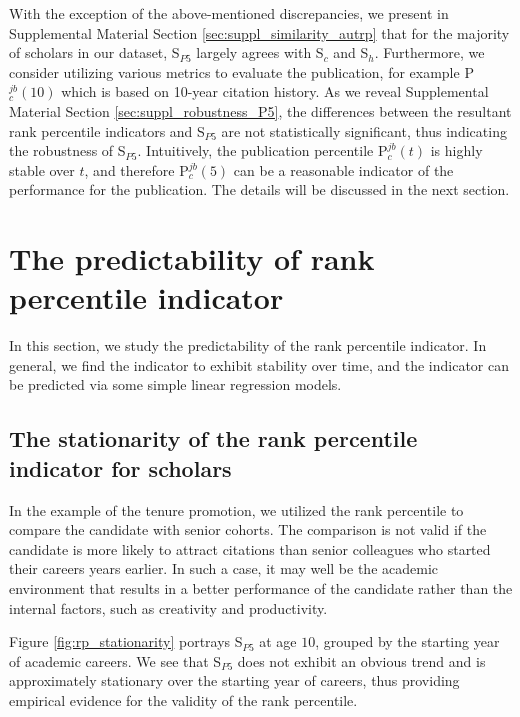 With the exception of the above-mentioned discrepancies, we present in Supplemental Material Section \ref{sec:suppl_similarity_autrp} that for the majority of scholars in our dataset, S$_{P5}$ largely agrees with S$_c$ and S$_h$. Furthermore, we consider utilizing various metrics to evaluate the publication, for example P$_c^{jb}(10)$ which is based on 10-year citation history. As we reveal Supplemental Material Section \ref{sec:suppl_robustness_P5}, the differences between the resultant rank percentile indicators and S$_{P5}$ are not statistically significant, thus indicating the robustness of S$_{P5}$. Intuitively, the publication percentile P$_c^{jb}(t)$ is highly stable over $t$, and therefore P$_c^{jb}(5)$ can be a reasonable indicator of the performance for the publication. The details will be discussed in the next section.

\section*{The predictability of rank percentile indicator}

In this section, we study the predictability of the rank percentile indicator. In general, we find the indicator to exhibit stability over time, and the indicator can be predicted via some simple linear regression models. 

\subsection*{The stationarity of the rank percentile indicator for scholars}

In the example of the tenure promotion, we utilized the rank percentile to compare the candidate with senior cohorts. The comparison is not valid if the candidate is more likely to attract citations than senior colleagues who started their careers years earlier. In such a case, it may well be the academic environment that results in a better performance of the candidate rather than the internal factors, such as creativity and productivity.

Figure \ref{fig:rp_stationarity} portrays S$_{P5}$ at age $10$, grouped by the starting year of academic careers. We see that S$_{P5}$ does not exhibit an obvious trend and is approximately stationary over the starting year of careers, thus providing empirical evidence for the validity of the rank percentile. 

